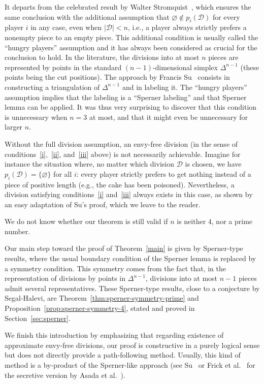 \documentclass[12pt]{amsart}
\theoremstyle{definition}
\theoremstyle{remark}
\def\D{\mathcal{D}}
\begin{document}
It departs from the celebrated result by Walter Stromquist~\cite{stromquist1980cut}, which ensures the same conclusion with the additional assumption that $\varnothing\notin p_i(\D)$ for every player $i$ in any case, even when $|\D|<n$, i.e., a player always strictly prefers a nonempty piece to an empty piece. This additional condition is usually called the ``hungry players'' assumption and it has always been considered as crucial for the conclusion to hold. In the literature, the divisions into at most $n$ pieces are represented by points in the standard $(n-1)$-dimensional simplex $\Delta^{n-1}$ (these points being the cut positions). The approach by Francis Su~\cite{su1999rental} consists in constructing a triangulation of $\Delta^{n-1}$ and in labeling it. The ``hungry players'' assumption implies that the labeling is a ``Sperner labeling'' and that Sperner lemma can be applied. 
It was thus very surprising to discover that this condition is unnecessary when $n=3$ at most, and that it might even be unnecessary for larger $n$.

Without the full division assumption, an envy-free division (in the sense of conditions~\ref{i},~\ref{ii}, and~\ref{iii} above)  is not necessarily achievable. Imagine for instance the situation where, no matter which division $\D$ is chosen, we have $p_i(\D)=\{\varnothing\}$ for all $i$: every player strictly prefers to get nothing instead of a piece of positive length (e.g., the cake has been poisoned). Nevertheless, a division satisfying conditions~\ref{i} and~\ref{iii} always exists in this case, as shown by an easy adaptation of Su's proof, which we leave to the reader.

We do not know whether our theorem is still valid if $n$ is neither $4$, nor a prime number.

Our main step toward the proof of Theorem~\ref{main} is given by Sperner-type results, where the usual boundary condition of the Sperner lemma is replaced by a symmetry condition. This symmetry comes from the fact that, in the representation of divisions by points in $\Delta^{n-1}$, divisions into at most $n-1$ pieces admit several representatives. These Sperner-type results, close to a conjecture by Segal-Halevi, are Theorem~\ref{thm:sperner-symmetry-prime} and Proposition~\ref{prop:sperner-symmetry-4}, stated and proved in Section~\ref{sec:sperner}.

We finish this introduction by emphasizing that regarding existence of approximate envy-free divisions, our proof is constructive in a purely logical sense but does not directly provide a path-following method. Usually, this kind of method is a by-product of the Sperner-like approach (see Su~\cite[Section 5]{su1999rental} or Frick et al.~\cite[Section 5]{frick2017achieving} for the secretive version by Asada et al.~\cite{asada2017fair}).
\end{document}
